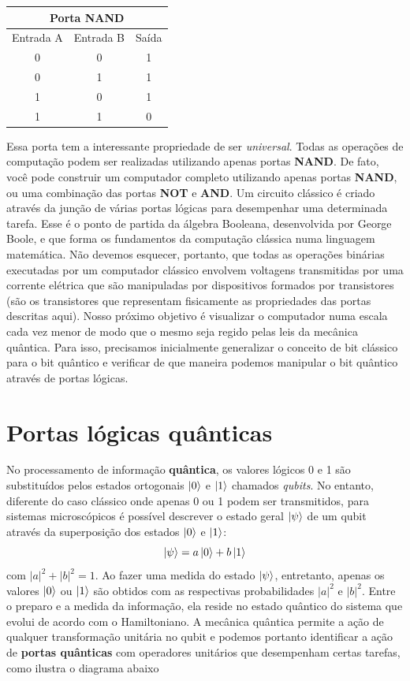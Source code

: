 \documentclass{article}
\begin{document}
\begin{center}
\begin{tabular} { |c|c|c|  }
 \hline
 \multicolumn{3}{|c|}{Porta \textbf{NAND}} \\
 \hline
 Entrada A & Entrada B & Saída\\
 \hline
 0 & 0 & 1\\
 0 & 1 & 1\\
 1 & 0 & 1\\
 1 & 1 & 0 \\
 \hline
\end{tabular}
\end{center}
Essa porta tem a interessante propriedade de ser \textit{universal}. Todas as operações de computação podem ser realizadas utilizando apenas portas \textbf{NAND}. De fato, você pode construir um computador completo utilizando apenas portas \textbf{NAND}, ou uma combinação das portas \textbf{NOT} e \textbf{AND}. Um circuito clássico é criado através da junção de várias portas lógicas para desempenhar uma determinada tarefa. Esse é o ponto de partida da álgebra Booleana, desenvolvida por George Boole, e que forma os fundamentos da computação clássica numa linguagem matemática. Não devemos esquecer, portanto, que todas as operações binárias executadas por um computador clássico envolvem voltagens transmitidas por uma corrente elétrica que são manipuladas por dispositivos formados por transistores (são os transistores que representam fisicamente as propriedades das portas descritas aqui). Nosso próximo objetivo é visualizar o computador numa escala cada vez menor de modo que o mesmo seja regido pelas leis da mecânica quântica. Para isso, precisamos inicialmente generalizar o conceito de bit clássico para o bit quântico e verificar de que maneira podemos manipular o bit quântico através de portas lógicas.





\section{Portas lógicas quânticas}

No processamento de informação \textbf{quântica}, os valores lógicos 0 e 1 são substituídos pelos estados ortogonais $\ket{0}$ e $\ket{1}$ chamados \textit{qubits}. No entanto, diferente do caso clássico onde apenas 0 ou 1 podem ser transmitidos, para sistemas microscópicos é possível descrever o estado geral $\ket{\psi}$ de um qubit através da superposição dos estados $\ket{0}$ e $\ket{1}$:
\begin{equation}
    \ket{\psi} = a\ket{0} + b\ket{1}
    \label{super}
\end{equation}
com $|a|^2 + |b|^2 = 1$. Ao fazer uma medida do estado $\ket{\psi}$, entretanto, apenas os valores $\ket{0}$ ou $\ket{1}$ são obtidos com as respectivas probabilidades $|a|^2$ e $|b|^2$. Entre o preparo e a medida da informação, ela reside no estado quântico do sistema que evolui de acordo com o Hamiltoniano. A mecânica quântica permite a ação de qualquer transformação unitária no qubit e podemos portanto identificar a ação de \textbf{portas quânticas} com operadores unitários que desempenham certas tarefas, como ilustra o diagrama abaixo
\end{document}
